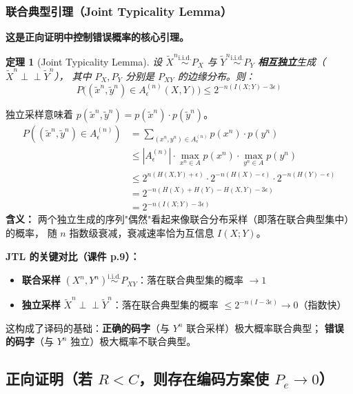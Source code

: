 \documentclass[12pt,a4paper]{ctexart}
\newtheorem{theorem}{定理}[section]
\theoremstyle{definition}
\newcommand{\indep}{\perp\!\!\!\perp}
\newcommand{\iid}{\overset{\text{i.i.d.}}{\sim}}
\begin{document}
\subsubsection{联合典型引理（Joint Typicality Lemma）}

\textbf{这是正向证明中控制错误概率的核心引理。}

\begin{theorem}[Joint Typicality Lemma]
设 $\tilde{X}^n \iid P_X$ 与 $\tilde{Y}^n \iid P_Y$ \textbf{相互独立}生成（$\tilde{X}^n \indep \tilde{Y}^n$），
其中 $P_X, P_Y$ 分别是 $P_{XY}$ 的边缘分布。则：
\[
P\big((\tilde{x}^n,\tilde{y}^n) \in A_\epsilon^{(n)}(X,Y)\big) \leq 2^{-n(I(X;Y)-3\epsilon)}
\]
\end{theorem}

\begin{proofbox}[联合典型引理证明]
独立采样意味着 $p(\tilde{x}^n,\tilde{y}^n) = p(\tilde{x}^n) \cdot p(\tilde{y}^n)$。
\begin{align*}
P((\tilde{x}^n,\tilde{y}^n) \in A_\epsilon^{(n)})
&= \sum_{(x^n,y^n) \in A_\epsilon^{(n)}} p(x^n) \cdot p(y^n) \\
&\leq |A_\epsilon^{(n)}| \cdot \max_{x^n \in A} p(x^n) \cdot \max_{y^n \in A} p(y^n) \\
&\leq 2^{n(H(X,Y)+\epsilon)} \cdot 2^{-n(H(X)-\epsilon)} \cdot 2^{-n(H(Y)-\epsilon)} \\
&= 2^{-n(H(X)+H(Y)-H(X,Y)-3\epsilon)} \\
&= 2^{-n(I(X;Y)-3\epsilon)}
\end{align*}
\textbf{含义：} 两个独立生成的序列"偶然"看起来像联合分布采样（即落在联合典型集中）的概率，
随 $n$ 指数级衰减，衰减速率恰为互信息 $I(X;Y)$。
\end{proofbox}

\noindent\textbf{JTL 的关键对比（课件 p.9）：}
\begin{itemize}[nosep]
  \item \textbf{联合采样} $(X^n,Y^n) \iid P_{XY}$：落在联合典型集的概率 $\to 1$
  \item \textbf{独立采样} $\tilde{X}^n \indep \tilde{Y}^n$：落在联合典型集的概率 $\leq 2^{-n(I-3\epsilon)} \to 0$（指数快）
\end{itemize}
这构成了译码的基础：\textbf{正确的码字}（与 $Y^n$ 联合采样）极大概率联合典型；
\textbf{错误的码字}（与 $Y^n$ 独立）极大概率不联合典型。


\subsection{正向证明（若 $R < C$，则存在编码方案使 $P_e \to 0$）}
\end{document}

